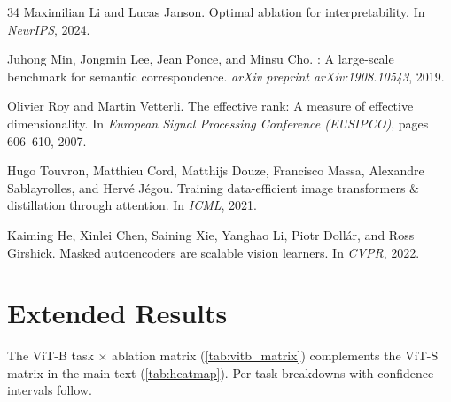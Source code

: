 \documentclass[10pt,twocolumn,letterpaper]{article}
\begin{document}
{\begin{thebibliography}{34}
Maximilian Li and Lucas Janson.
\newblock Optimal ablation for interpretability.
\newblock In \emph{NeurIPS}, 2024.

Juhong Min, Jongmin Lee, Jean Ponce, and Minsu Cho.
: A large-scale benchmark for semantic correspondence.
\newblock \emph{arXiv preprint arXiv:1908.10543}, 2019.

Olivier Roy and Martin Vetterli.
\newblock The effective rank: A measure of effective dimensionality.
\newblock In \emph{European Signal Processing Conference (EUSIPCO)}, pages
  606--610, 2007.

Hugo Touvron, Matthieu Cord, Matthijs Douze, Francisco Massa, Alexandre
  Sablayrolles, and Herv{\'e} J{\'e}gou.
\newblock Training data-efficient image transformers \& distillation through
  attention.
\newblock In \emph{ICML}, 2021.

Kaiming He, Xinlei Chen, Saining Xie, Yanghao Li, Piotr Doll{\'a}r, and Ross
  Girshick.
\newblock Masked autoencoders are scalable vision learners.
\newblock In \emph{CVPR}, 2022.

\end{thebibliography}
 
}

\clearpage
\maketitlesupplementary



\renewcommand{\topfraction}{0.9}
\renewcommand{\bottomfraction}{0.9}
\renewcommand{\textfraction}{0.05}
\renewcommand{\floatpagefraction}{0.85}
\renewcommand{\dbltopfraction}{0.9}
\setcounter{topnumber}{4}
\setcounter{bottomnumber}{4}
\setcounter{totalnumber}{8}
\setcounter{dbltopnumber}{4}

\section{Extended Results}
\label{sec:supp_results}

The ViT-B task $\times$ ablation matrix (\cref{tab:vitb_matrix}) complements the ViT-S matrix in the main text (\cref{tab:heatmap}). Per-task breakdowns with confidence intervals follow.
\end{document}
